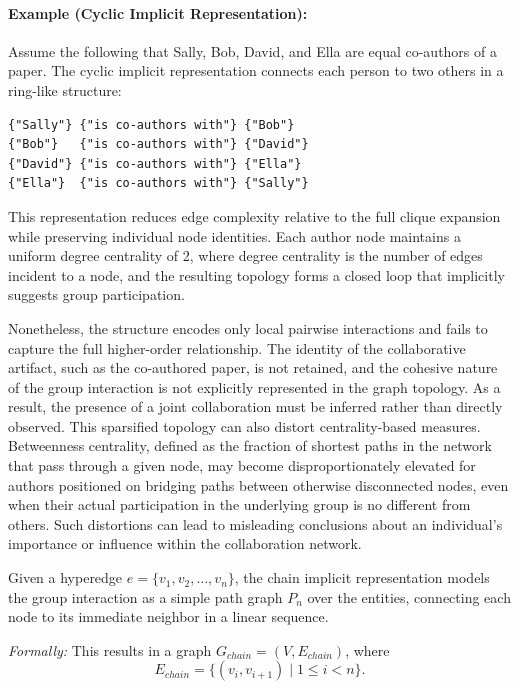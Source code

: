 \documentclass{article}
\begin{document}
\paragraph{Example (Cyclic Implicit Representation):} Assume the following that Sally, Bob, David, and Ella are equal co-authors of a paper. The cyclic implicit representation connects each person to two others in a ring-like structure:

\begin{verbatim}
{"Sally"} {"is co-authors with"} {"Bob"}
{"Bob"}   {"is co-authors with"} {"David"}
{"David"} {"is co-authors with"} {"Ella"}
{"Ella"}  {"is co-authors with"} {"Sally"}
\end{verbatim}

This representation reduces edge complexity relative to the full clique expansion while preserving individual node identities. Each author node maintains a uniform degree centrality of 2, where degree centrality is the number of edges incident to a node, and the resulting topology forms a closed loop that implicitly suggests group participation.

Nonetheless, the structure encodes only local pairwise interactions and fails to capture the full higher-order relationship. The identity of the collaborative artifact, such as the co-authored paper, is not retained, and the cohesive nature of the group interaction is not explicitly represented in the graph topology. As a result, the presence of a joint collaboration must be inferred rather than directly observed. This sparsified topology can also distort centrality-based measures. Betweenness centrality, defined as the fraction of shortest paths in the network that pass through a given node, may become disproportionately elevated for authors positioned on bridging paths between otherwise disconnected nodes, even when their actual participation in the underlying group is no different from others. Such distortions can lead to misleading conclusions about an individual’s importance or influence within the collaboration network.


\begin{mdframed}[linewidth=1pt, linecolor=black!60, backgroundcolor=gray!5]
\begin{defn}
Given a hyperedge $e = \{v_1, v_2, \ldots, v_n\}$, the chain implicit representation models the group interaction as a simple path graph $P_n$ over the entities, connecting each node to its immediate neighbor in a linear sequence. 

\medskip

\noindent\textit{Formally:} This results in a graph $G_{chain} = (V, E_{chain})$, where
\[
E_{chain} = \{(v_i, v_{i+1}) \mid 1 \leq i < n\}.
\]
\end{defn}
\end{mdframed}
\end{document}
